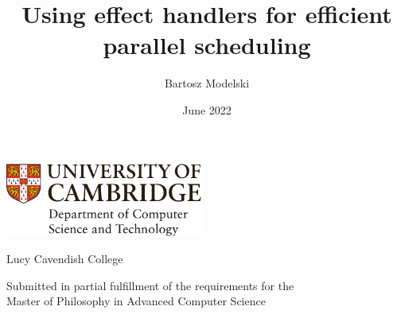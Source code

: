\documentclass[12pt,a4paper,twoside]{report}
\title{Using effect handlers for efficient parallel scheduling}
\author{Bartosz Modelski}
\date{June 2022}
\newif\ifsubmission %
\newcommand{\candidatenumber}{2094I}
\newcommand{\college}{Lucy Cavendish College}
\newcommand{\course}{Master of Philosophy in Advanced Computer Science}
\begin{document}
\begin{sffamily} %

\begin{titlepage}
\makeatletter

\hspace*{-14mm}\includegraphics[width=65mm]{logo-dcst-colour}

\ifsubmission

\begin{Large}
\vspace{20mm}
Research project report title page

\vspace{35mm}
Candidate \candidatenumber

\vspace{42mm}
\textsl{``\@title''}

\end{Large}

\else

\begin{center}
\Huge
\vspace{\fill}

\@title
\vspace{\fill}

\@author
\vspace{10mm}

\Large
\college
\vspace{\fill}

\@date
\vspace{\fill}

\end{center}

\fi

\vspace{\fill}
\begin{center}
Submitted in partial fulfillment of the requirements for the\\
\course
\end{center}

\makeatother
\end{titlepage}

\newpage


\end{sffamily}
\end{document}
